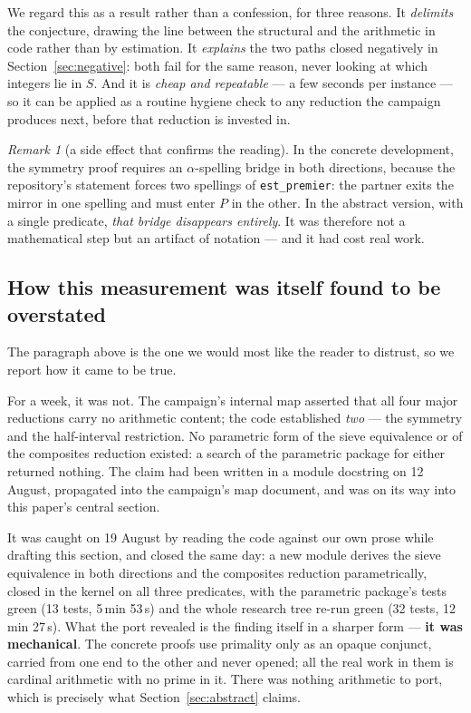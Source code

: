 \documentclass[11pt]{article}
\theoremstyle{remark}\newtheorem{remark}{Remark}
\begin{document}
We regard this as a result rather than a confession, for three reasons. It
\emph{delimits} the conjecture, drawing the line between the structural and the
arithmetic in code rather than by estimation. It \emph{explains} the two paths closed
negatively in Section~\ref{sec:negative}: both fail for the same reason, never looking
at which integers lie in $S$. And it is \emph{cheap and repeatable} --- a few seconds
per instance --- so it can be applied as a routine hygiene check to any reduction the
campaign produces next, before that reduction is invested in.

\begin{remark}[a side effect that confirms the reading]
In the concrete development, the symmetry proof requires an $\alpha$-spelling bridge in
both directions, because the repository's statement forces two spellings of
\texttt{est\_premier}: the partner exits the mirror in one spelling and must enter $P$
in the other. In the abstract version, with a single predicate, \emph{that bridge
disappears entirely}. It was therefore not a mathematical step but an artifact of
notation --- and it had cost real work.
\end{remark}

\subsection{How this measurement was itself found to be overstated}
\label{sec:overclaim}

The paragraph above is the one we would most like the reader to distrust, so we report
how it came to be true.

For a week, it was not. The campaign's internal map asserted that all four major
reductions carry no arithmetic content; the code established \emph{two} --- the
symmetry and the half-interval restriction. No parametric form of the sieve equivalence
or of the composites reduction existed: a search of the parametric package for either
returned nothing. The claim had been written in a module docstring on 12 August,
propagated into the campaign's map document, and was on its way into this paper's
central section.

It was caught on 19 August by reading the code against our own prose while drafting
this section, and closed the same day: a new module derives the sieve equivalence in
both directions and the composites reduction parametrically, closed in the kernel on
all three predicates, with the parametric package's tests green (13 tests,
5\,min 53\,s) and the whole research tree re-run green (32 tests, 12\,min 27\,s). What the
port revealed is the finding itself in a sharper form --- \textbf{it was mechanical}.
The concrete proofs use primality only as an opaque conjunct, carried from one end to
the other and never opened; all the real work in them is cardinal arithmetic with no
prime in it. There was nothing arithmetic to port, which is precisely what
Section~\ref{sec:abstract} claims.
\end{document}
